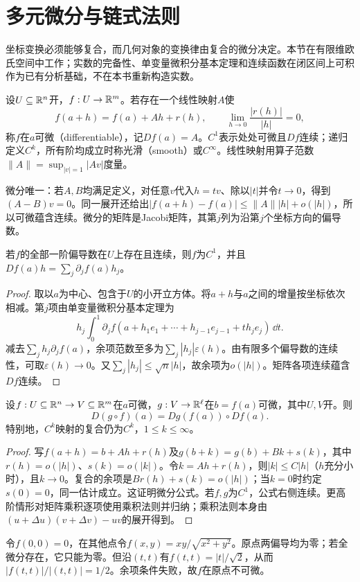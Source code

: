 \section{多元微分与链式法则}
坐标变换必须能够复合，而几何对象的变换律由复合的微分决定。本节在有限维欧氏空间中工作；实数的完备性、单变量微积分基本定理和连续函数在闭区间上可积作为已有分析基础，不在本书重新构造实数。
\begin{definition}[全微分与光滑映射]
设$U\subseteq\mathbb{R}^n$开，$f:U\to\mathbb{R}^m$。若存在一个线性映射$A$使
\[
 f(a+h)=f(a)+Ah+r(h),\qquad \lim_{h\to0}\frac{|r(h)|}{|h|}=0,
\]
称$f$在$a$可微（differentiable），记$Df(a)=A$。$C^1$表示处处可微且$Df$连续；递归定义$C^k$，所有阶均成立时称光滑（smooth）或$C^\infty$。线性映射用算子范数$\|A\|=\sup_{|v|=1}|Av|$度量。
\end{definition}
微分唯一：若$A,B$均满足定义，对任意$v$代入$h=tv$、除以$|t|$并令$t\to0$，得到$(A-B)v=0$。同一展开还给出$|f(a+h)-f(a)|\leq\|A\||h|+o(|h|)$，所以可微蕴含连续。微分的矩阵是Jacobi矩阵，其第$j$列为沿第$j$个坐标方向的偏导数。
\begin{theorem}[连续偏导判别]\label{thm:continuous-partials}
若$f$的全部一阶偏导数在$U$上存在且连续，则$f$为$C^1$，并且$Df(a)h=\sum_j\partial_j f(a)h_j$。
\end{theorem}
\begin{proof}
取以$a$为中心、包含于$U$的小开立方体。将$a+h$与$a$之间的增量按坐标依次相减。第$j$项由单变量微积分基本定理为
\[
 h_j\int_0^1\partial_j f(a+h_1e_1+\cdots+h_{j-1}e_{j-1}+t h_je_j)\,\dd t.
\]
减去$\sum_jh_j\partial_j f(a)$，余项范数至多为$\sum_j|h_j|\varepsilon(h)$。由有限多个偏导数的连续性，可取$\varepsilon(h)\to0$。又$\sum_j|h_j|\leq\sqrt n|h|$，故余项为$o(|h|)$。矩阵各项连续蕴含$Df$连续。
\end{proof}
\begin{theorem}[链式法则]\label{thm:euclidean-chain}
设$f:U\subseteq\mathbb{R}^n\to V\subseteq\mathbb{R}^m$在$a$可微，$g:V\to\mathbb{R}^\ell$在$b=f(a)$可微，其中$U,V$开。则
\[
 D(g\circ f)(a)=Dg(f(a))\circ Df(a).
\]
特别地，$C^k$映射的复合仍为$C^k$，$1\leq k\leq\infty$。
\end{theorem}
\begin{proof}
写$f(a+h)=b+Ah+r(h)$及$g(b+k)=g(b)+Bk+s(k)$，其中$r(h)=o(|h|)$、$s(k)=o(|k|)$。令$k=Ah+r(h)$，则$|k|\leq C|h|$（$h$充分小时），且$k\to0$。复合的余项是$Br(h)+s(k)=o(|h|)$；当$k=0$时约定$s(0)=0$，同一估计成立。这证明微分公式。若$f,g$为$C^1$，公式右侧连续。更高阶情形对矩阵乘积逐项使用乘积法则并归纳；乘积法则本身由$(u+\Delta u)(v+\Delta v)-uv$的展开得到。
\end{proof}
\begin{example}[只有偏导不够]
令$f(0,0)=0$，在其他点令$f(x,y)=xy/\sqrt{x^2+y^2}$。原点两偏导均为零；若全微分存在，它只能为零。但沿$(t,t)$有$f(t,t)=|t|/\sqrt2$，从而$|f(t,t)|/|(t,t)|=1/2$。余项条件失败，故$f$在原点不可微。
\end{example}
